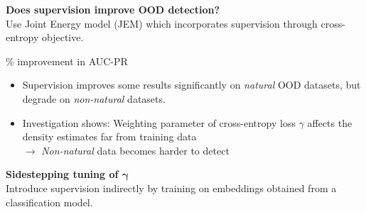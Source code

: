\documentclass[landscape,a0paper,fontscale=0.30]{baposter}
\begin{document}
\begin{poster}
{\begin{minipage}[t]{0.48\linewidth}
    \vspace{1em}

    \textbf{\color{blue}Does supervision improve OOD detection?}\\
    Use Joint Energy model (JEM) which incorporates supervision through cross-entropy objective.
    \begin{center}
        \resizebox{.45\textwidth}{!}{
            
        }
        \vspace{0.5em}

        {\small \% improvement in AUC-PR}
    \end{center}
    \begin{itemize}
        \item Supervision improves some results significantly on \textit{natural} OOD datasets, but degrade on \textit{non-natural} datasets. 
        \item Investigation shows: Weighting parameter of cross-entropy loss \(\gamma \) affects the density estimates far from training data \\
        \(\rightarrow \) \textit{Non-natural} data becomes harder to detect
    \end{itemize}
    \begin{center}
    \end{center}
    \end{minipage}%
    \hfill
    \begin{minipage}[t]{.48\linewidth}
        \textbf{\small \color{blue}Sidestepping tuning of \(\boldsymbol{\gamma} \)}\\
        Introduce supervision indirectly by training on embeddings obtained from a classification model.
        \begin{center}
        \resizebox{0.5\textwidth}{!}{
        
        }
        \vspace{0.5em}


\end{center}
\end{minipage}}
\end{poster}
\end{document}
